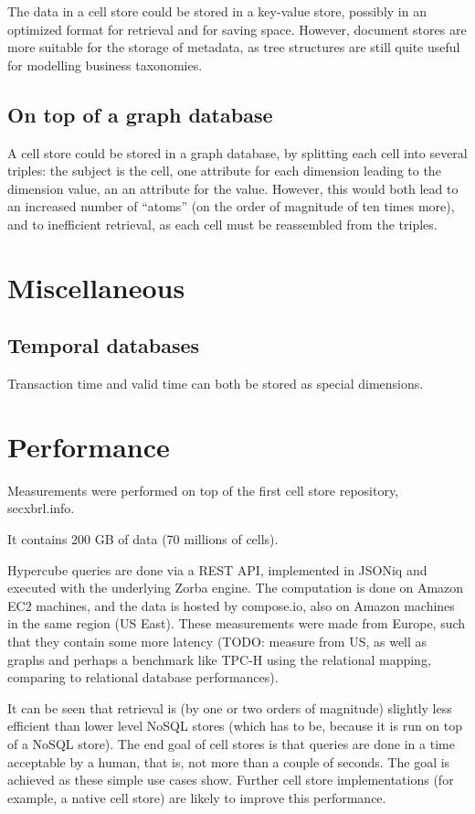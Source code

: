 \documentclass{vldb}
\begin{document}
The data in a cell store could be stored in a key-value store, possibly in an optimized format for retrieval and for saving space. However, document stores are more suitable for the storage of metadata, as tree structures are still quite useful for modelling business taxonomies.

\subsection{On top of a graph database}

A cell store could be stored in a graph database, by splitting each cell into several triples: the subject is the cell, one attribute for each dimension leading to the dimension value, an an attribute for the value. However, this would both lead to an increased number of ``atoms'' (on the order of magnitude of ten times more), and to inefficient retrieval, as each cell must be reassembled from the triples.

\section{Miscellaneous}

\subsection{Temporal databases}

Transaction time and valid time can both be stored as special dimensions.

\section{Performance}

Measurements were performed on top of the first cell store repository, secxbrl.info.

It contains 200 GB of data (70 millions of cells).

Hypercube queries are done via a REST API, implemented in JSONiq and executed with the underlying Zorba engine. The computation is done on Amazon EC2 machines, and the data is hosted by compose.io, also on Amazon machines in the same region (US East). These measurements were made from Europe, such that they contain some more latency (TODO: measure from US, as well as graphs and perhaps a benchmark like TPC-H using the relational mapping, comparing to relational database performances). 

It can be seen that retrieval is (by one or two orders of magnitude) slightly less efficient than lower level NoSQL stores (which has to be, because it is run on top of a NoSQL store). The end goal of cell stores is that queries are done in a time acceptable by a human, that is, not more than a couple of seconds. The goal is achieved as these simple use cases show. Further cell store implementations (for example, a native cell store) are likely to improve this performance.
\end{document}
